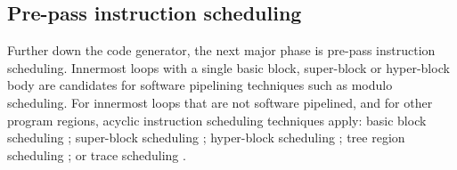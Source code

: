 \subsection{Pre-pass instruction scheduling}

Further down the code generator, the next major phase is pre-pass instruction
scheduling. Innermost loops with a single basic block, super-block or
hyper-block body are candidates for software pipelining techniques such as
modulo scheduling. For innermost loops that are not software pipelined, and for
other program regions, acyclic instruction scheduling techniques apply: basic
block scheduling \cite{Goodman:1988:ICS}; super-block scheduling
\cite{Hwu:1993:JS}; hyper-block scheduling \cite{Mahlke:1992:MICRO}; tree region
scheduling \cite{Havanki:1998:HPCA}; or trace scheduling \cite{Lowney:1993:JS}.

